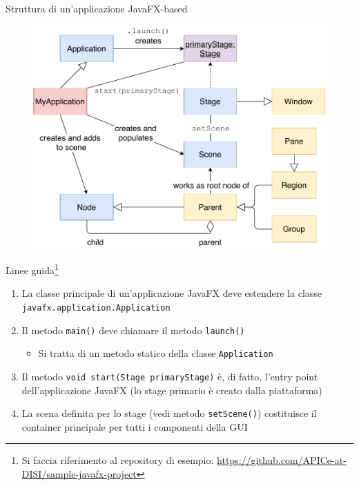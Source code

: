 \documentclass[xcolor=dvipsnames,presentation]{beamer}
\begin{document}
\begin{frame}{Struttura di un'applicazione JavaFX-based}
\begin{figure}
\includegraphics[height=0.86\textheight]{img/javafx-app-structure.pdf}
\end{figure}
\end{frame}

\begin{frame}{Linee guida\footnote{Si faccia riferimento al repository di esempio: 
\url{https://github.com/APICe-at-DISI/sample-javafx-project}
}}

\begin{enumerate}\itemsep15pt

\item La classe principale di un'applicazione JavaFX deve estendere la classe \texttt{javafx.application.Application}
\item Il metodo \texttt{main()} deve chiamare il metodo \texttt{launch()}
\begin{itemize}
\item Si tratta di un metodo statico della classe \texttt{Application}
\end{itemize}
\item Il metodo \texttt{void start(Stage primaryStage)} è, di fatto, l'entry point dell'applicazione JavaFX (lo stage primario è creato dalla piattaforma)
\item La scena definita per lo stage (vedi metodo \texttt{setScene()}) costituisce il container principale per tutti i componenti della GUI
\end{enumerate}
\end{frame}
\end{document}

